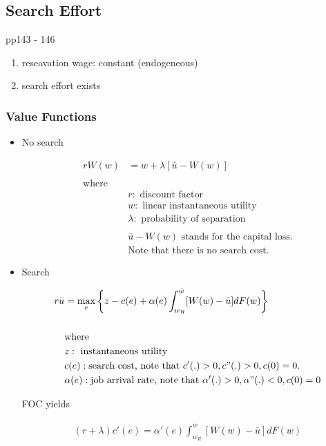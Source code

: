 \documentclass[dvipdfmx, 12pt]{article}
\begin{document}
\subsection{Search Effort}

pp143 - 146

\begin{enumerate}
  \item reseavation wage: constant (endogeneous)

  \item search effort exists
\end{enumerate}

\subsubsection{Value Functions}

\begin{itemize}
  \item No search

  \begin{align*}
    r W(w) &= w + \lambda [\bar{u} - W(w)] \\
    \\
    \text{where} \\
    & r: \text{ discount factor} \\
    & w: \text{ linear instantaneous utility} \\
    & \lambda: \text{ probability of separation} \\
    \\
    & \bar{u} - W(w) \text{ stands for the capital loss.} \\
    & \text{Note that there is no search cost.}
  \end{align*}

  \item Search

  \begin{align*}
    r \bar{u} &= \max_e \left\{z - c(e) + \alpha(e) \int_{w_R}^{\bar{w}} [W(w) - \bar{u}] dF(w) \right\} \\
    \\
    &\text{where} \\
    & z: \text{ instantaneous utility} \\
    & c(e): \text{search cost, note that }c'(.) > 0, c"(.) > 0, c(0) = 0. \\
    & \alpha(e): \text{job arrival rate, note that } \alpha'(.) > 0, \alpha"(.) < 0, c(0) = 0
  \end{align*}

  FOC yields

  \begin{align*}
    (r + \lambda)c'(e) = \alpha'(e) \int_{w_R}^{\bar{w}}[W(w) - \bar{u}]dF(w)
  \end{align*}

\end{itemize}
\end{document}
